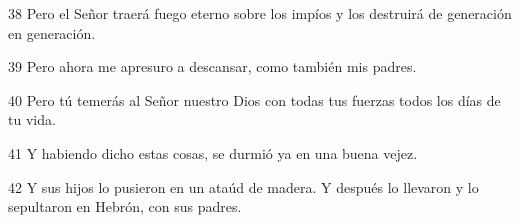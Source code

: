 \par 38 Pero el Señor traerá fuego eterno sobre los impíos y los destruirá de generación en generación.

\par 39 Pero ahora me apresuro a descansar, como también mis padres.

\par 40 Pero tú temerás al Señor nuestro Dios con todas tus fuerzas todos los días de tu vida.

\par 41 Y habiendo dicho estas cosas, se durmió ya en una buena vejez.

\par 42 Y sus hijos lo pusieron en un ataúd de madera. Y después lo llevaron y lo sepultaron en Hebrón, con sus padres.



